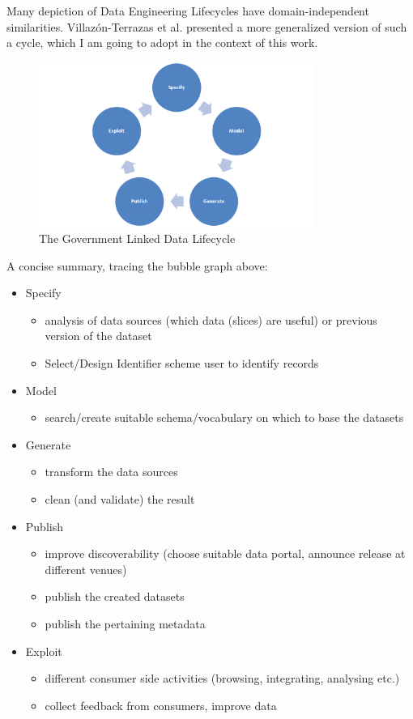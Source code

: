 \documentclass[a4paper,english,twoside,BCOR1.5cm,headsepline,DIV12,appendixprefix,final,12pt]{scrbook}
\begin{document}
Many depiction of Data Engineering Lifecycles have domain-independent similarities.
Villaz\'{o}n-Terrazas et al. presented a more generalized version of such a cycle, which I am going to adopt in the context of this work.

 \begin{figure}[!htbp]
\centering
  \includegraphics[width=9cm]{images/Villazon-terrazas.png}
  \caption{The Government Linked Data Lifecycle \cite{Terrazas}}
  \label{fig:gldlifecycle}
\end{figure}

A concise summary, tracing the bubble graph above:

\begin{itemize}
\item Specify
\begin{itemize}
\item analysis of data sources (which data (slices) are useful) or previous version of the dataset
\item Select/Design Identifier scheme user to identify records
\end{itemize}
\item Model
\begin{itemize}
\item search/create suitable schema/vocabulary on which to base the datasets
\end{itemize}
\item Generate
\begin{itemize}
\item transform the data sources
\item clean (and validate) the result
\end{itemize}
\item Publish
\begin{itemize}
\item improve discoverability (choose suitable data portal, announce release at different venues)
\item publish the created datasets
\item publish the pertaining metadata
\end{itemize}
\item Exploit
\begin{itemize}
\item different consumer side activities (browsing, integrating, analysing etc.)
\item collect feedback from consumers, improve data
\end{itemize}
\end{itemize}
\end{document}
